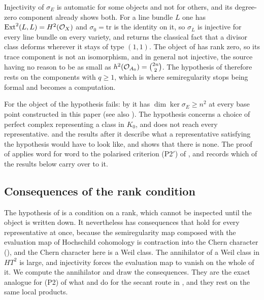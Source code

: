 \begin{remark}
\label{rem:semiregunavailable}
Injectivity of $\sigma_{E}$ is automatic for some objects and not for
others, and its degree-zero component already shows both. For a line bundle
$L$ one has $\operatorname{Ext}^{2}(L,L)=H^{2}(\mathcal{O}_{X})$ and $\sigma_{0}=\mathrm{tr}$ is the
identity on it, so $\sigma_{L}$ is injective for every line bundle on every
variety, and  returns the classical fact that a divisor class
deforms wherever it stays of type $(1,1)$. The object of 
has rank zero, so its trace component is not an isomorphism, and in general
not injective, the source having no reason to be as small as
$h^{2}(\mathcal{O}_{A_{0}})=\binom{2n}{2}$. The hypothesis of
 therefore rests on the components with $q\ge1$,
which is where semiregularity stops being formal and becomes a computation.

For the object of  the hypothesis fails: by
\cite[Proposition~9.10]{paperI} it has $\dim\ker\sigma_{E}\ge n^{2}$ at every base
point constructed in this paper (see also \cite[Remark~9.13]{paperI}). The
hypothesis concerns a choice of perfect complex representing a class in
$K_{0}$, and \cite[Proposition~9.10]{paperI} does not reach every representative.
 and the results after it describe what a representative
satisfying the hypothesis would have to look like, and 
shows that there is none. The proof of  applies word
for word to the polarised criterion \textup{(P2$'$)} of ,
and  records which of the results below carry over
to it.
\end{remark}

\subsection{Consequences of the rank condition}

The hypothesis of  is a condition on a rank, which
cannot be inspected until the object is written down. It nevertheless has
consequences that hold for every representative at once, because the
semiregularity map composed with the evaluation map of Hochschild cohomology
is contraction into the Chern character (), and the
Chern character here is a Weil class. The annihilator of a Weil class in
$HT^{2}$ is large, and injectivity forces the evaluation map to vanish on the
whole of it. We compute the annihilator and draw the consequences. They are
the exact analogue for (P2) of what  and
 do for the secant route in , and
they rest on the same local products.

